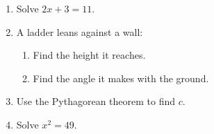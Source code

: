 \documentclass{article}\usepackage{enumitem}
\begin{document}
\begin{enumerate}[leftmargin=*]
  \item Solve $2x + 3 = 11$. \\[2.6cm]
  \item A ladder leans against a wall: \\[2.6cm]
    \begin{enumerate}[label=(\alph*)]
      \item Find the height it reaches. \\[2.6cm]
      \item Find the angle it makes with the ground. \\[2.6cm]
    \end{enumerate}
  \item Use the Pythagorean theorem to find $c$.
  \item Solve $x^2 = 49$.
\end{enumerate}
\end{document}
